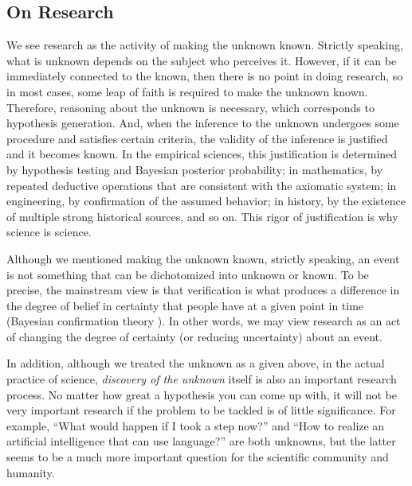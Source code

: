 \documentclass{article}
\begin{document}
\subsection{On Research}
We see research as the activity of making the unknown known. Strictly speaking, what is unknown depends on the subject who perceives it. However, if it can be immediately connected to the known, then there is no point in doing research, so in most cases, some leap of faith is required to make the unknown known. Therefore, reasoning about the unknown is necessary, which corresponds to hypothesis generation. And, when the inference to the unknown undergoes some procedure and satisfies certain criteria, the validity of the inference is justified and it becomes known. In the empirical sciences, this justification is determined by hypothesis testing and Bayesian posterior probability; in mathematics, by repeated deductive operations that are consistent with the axiomatic system; in engineering, by confirmation of the assumed behavior; in history, by the existence of multiple strong historical sources, and so on. This rigor of justification is why science is science.

Although we mentioned making the unknown known, strictly speaking, an event is not something that can be dichotomized into unknown or known. To be precise, the mainstream view is that verification is what produces a difference in the degree of belief in certainty that people have at a given point in time (Bayesian confirmation theory \cite{confirmation}). In other words, we may view research as an act of changing the degree of certainty (or reducing uncertainty) about an event.

In addition, although we treated the unknown as a given above, in the actual practice of science, \textit{discovery of the unknown} itself is also an important research process. No matter how great a hypothesis you can come up with, it will not be very important research if the problem to be tackled is of little significance. For example, ``What would happen if I took a step now?'' and ``How to realize an artificial intelligence that can use language?'' are both unknowns, but the latter seems to be a much more important question for the scientific community and humanity.
\end{document}
